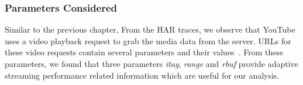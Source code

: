 \subsubsection{Parameters Considered}
Similar to the previous chapter, From the HAR traces, we observe that YouTube uses a video playback request to grab the media data from the server. URLs for these video requests contain several parameters and their values~\cite{mondal2017youtube}. From these parameters, we found that three parameters \textit{itag}, \textit{range} and  \textit{rbuf} provide adaptive streaming performance related information which are useful for our analysis. %

